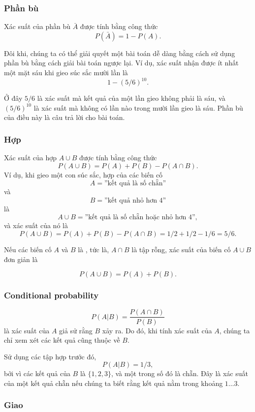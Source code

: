 \subsubsection{Phần bù}

Xác suất của phần bù
$\bar A$ được tính bằng công thức
\[P(\bar A)=1-P(A).\]

Đôi khi, chúng ta có thể giải quyết một bài toán dễ dàng
bằng cách sử dụng phần bù bằng cách giải bài toán ngược lại.
Ví dụ, xác suất nhận được
ít nhất một mặt sáu khi gieo súc sắc mười lần là
\[1-(5/6)^{10}.\]

Ở đây $5/6$ là xác suất mà kết quả
của một lần gieo không phải là sáu, và
$(5/6)^{10}$ là xác suất mà không có lần nào trong
mười lần gieo là sáu.
Phần bù của điều này là câu trả lời cho bài toán.

\subsubsection{Hợp}

Xác suất của hợp $A \cup B$
được tính bằng công thức
\[P(A \cup B)=P(A)+P(B)-P(A \cap B).\]
Ví dụ, khi gieo một con súc sắc,
hợp của các biến cố
\[A=\textrm{''kết quả là số chẵn''}\]
và
\[B=\textrm{''kết quả nhỏ hơn 4''}\]
là
\[A \cup B=\textrm{''kết quả là số chẵn hoặc nhỏ hơn 4''},\]
và xác suất của nó là
\[P(A \cup B) = P(A)+P(B)-P(A \cap B)=1/2+1/2-1/6=5/6.\]

Nếu các biến cố $A$ và $B$ là , tức là,
$A \cap B$ là tập rỗng,
xác suất của biến cố $A \cup B$ đơn giản là

\[P(A \cup B)=P(A)+P(B).\]

\subsubsection{Conditional probability}


\[P(A | B) = \frac{P(A \cap B)}{P(B)}\]
là xác suất của $A$
giả sử rằng $B$ xảy ra.
Do đó, khi tính
xác suất của $A$, chúng ta chỉ xem xét các kết quả
cũng thuộc về $B$.

Sử dụng các tập hợp trước đó,
\[P(A | B)= 1/3,\]
bởi vì các kết quả của $B$ là
$\{1,2,3\}$, và một trong số đó là chẵn.
Đây là xác suất của một kết quả chẵn
nếu chúng ta biết rằng kết quả nằm trong khoảng $1 \ldots 3$.

\subsubsection{Giao}


